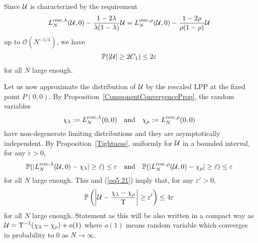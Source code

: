\documentclass[12pt,a4paper]{article}
\numberwithin{equation}{section}
\newcommand{\Or}{\mathcal{O}}
\newcommand{\Pb}{\mathbb{P}}
\newcommand{\e}{\varepsilon}
\begin{document}
Since ${\cal U}$ is characterized by the requirement
\begin{equation}\label{eq5.15}
L_N^{{\rm resc},\lambda}({\cal U},0)-\frac{1-2\lambda}{\lambda(1-\lambda)}{\cal U} =L_N^{{\rm resc},\rho}({\cal U},0)-\frac{1-2\rho}{\rho(1-\rho)}{\cal U}
\end{equation}
up to $\Or(N^{-1/3})$, we have
\begin{equation}\label{eq5.21}
\Pb(|{\cal U}|\geq 2C_1)\leq 2\e
\end{equation}
for all $N$ large enough.

Let us now approximate the distribution of ${\cal U}$ by the rescaled LPP at the fixed point $P(0,0)$. By Proposition~\ref{ComponentConvergenceProp}, the random variables
\begin{equation}\label{eq5.22}
\chi_\lambda:=L_N^{{\rm resc},\lambda}(0,0)\quad\textrm{and}\quad \chi_\rho:=L_N^{{\rm resc},\rho}(0,0)
\end{equation}
have non-degenerate limiting distributions and they are asymptotically independent. By Proposition~\ref{Tightness}, uniformly for $\cal U$ in a bounded interval, for any $\tilde\e>0$,
\begin{equation}\label{eq5.23}
\Pb(|L_N^{{\rm resc},\lambda}({\cal U},0)-\chi_\lambda|\geq \tilde\e)\leq \e\quad\textrm{and}\quad \Pb(|L_N^{{\rm resc},\rho}({\cal U},0)-\chi_\rho|\geq \tilde\e)\leq \e
\end{equation}
for all $N$ large enough. This and (\ref{eq5.21}) imply that, for any $\e'>0$,
\begin{equation}
\Pb\left(\left|{\cal U}-\frac{\chi_\lambda-\chi_\rho}{\Upsilon}\right|\geq \e'\right)\leq 4\e
\end{equation}
for all $N$ large enough. Statement as this will be also written in a compact way as ${\cal U} = \Upsilon^{-1} (\chi_\lambda-\chi_\rho)+o(1)$ where $o(1)$ means random variable which converges in probability to $0$ as $N\to \infty$.
\end{document}
